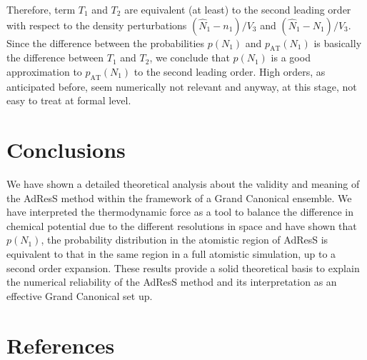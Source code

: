\documentclass[aip,jcp,a4paper,reprint,onecolumn]{revtex4-1}
\newcommand{\AT}{{\textrm{{AT}}}}
\newcommand{\CG}{{\textrm{CG}}}
\begin{document}
Therefore, term $T_1$ and $T_2$ are equivalent (at least) to the second leading
order with respect to the density perturbations
$(\hat N_1 - n_1)/{V_3}$
and $(\hat N_1 - N_1)/{V_3}$.
Since the difference between the probabilities
$p(N_1)$ and $p_{\AT}(N_1)$ is basically the difference between $T_1$
and $T_2$, we conclude that $p(N_1)$ is a good approximation to
$p_{\AT}(N_1)$ to the second leading order. High orders, as anticipated before, seem numerically not relevant and anyway, at this stage, not easy to treat at formal level.
\section{Conclusions}
We have shown a detailed theoretical analysis about the validity and meaning of the AdResS method within the framework of a Grand Canonical ensemble. We have interpreted the thermodynamic force as a tool to balance the difference in chemical potential due to the different resolutions in space and have shown that $p(N_{1})$, the probability distribution in the atomistic region of AdResS is equivalent to that in the same region in a full atomistic simulation, up to a second order expansion. These results provide a solid theoretical basis to explain the numerical reliability of the AdResS method and its interpretation as an effective Grand Canonical set up.


\section*{References}
{}

\end{document}
